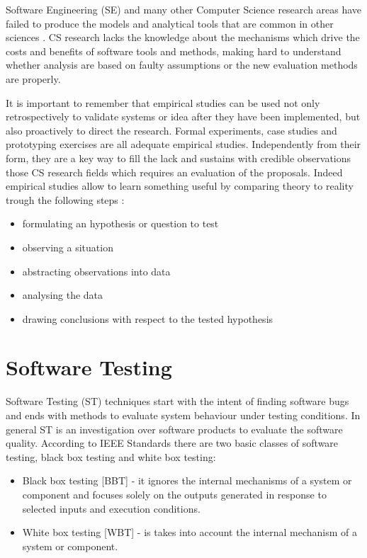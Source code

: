 Software Engineering (SE) and many other Computer Science research areas have failed to produce the models and analytical tools that are common in other sciences \cite{Perry:2000:ESS:336512.336586}. CS research lacks the knowledge about the mechanisms which drive the costs and benefits of software tools and methods, making hard to understand whether analysis are based on faulty assumptions or the new evaluation methods are properly.

It is important to remember that empirical studies can be used not only retrospectively to validate systems or idea after they have been implemented, but also proactively to direct the research. Formal experiments, case studies and prototyping exercises are all adequate empirical studies. Independently from their form, they are a key way to fill the lack and sustains with credible observations those CS research fields which requires an evaluation of the proposals. Indeed empirical studies allow to learn something useful by comparing theory to reality trough the following steps \cite{Perry:2000:ESS:336512.336586}:
\begin{itemize}
\item  formulating an hypothesis or question to test
\item  observing a situation
\item  abstracting observations into data
\item  analysing the data
\item  drawing conclusions with respect to the tested hypothesis
\end{itemize}

\section{Software Testing}\label{sec:software-testing}
Software Testing (ST) techniques start with the intent of finding software bugs and ends with methods to evaluate system behaviour under testing conditions. In general ST is an investigation over software products to evaluate the software quality. According to IEEE Standards  \cite{IEEEStd610.12-1990:glossary} there are two basic classes of software testing, black box testing and white box testing: 

\begin{itemize}
\item Black box testing [BBT] - it ignores the internal mechanisms of a system or component and focuses solely on the outputs
generated in response to selected inputs and execution conditions.
\item White box testing [WBT] - is takes into account the internal mechanism of a system or component. 
\end{itemize} 

